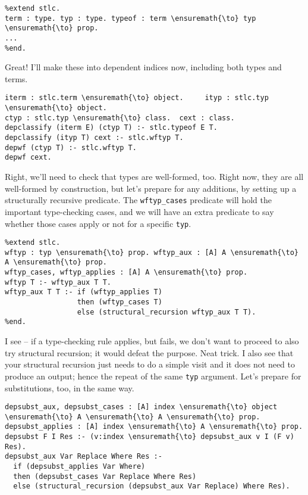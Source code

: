 \begin{verbatim}
%extend stlc.
term : type. typ : type. typeof : term \ensuremath{\to} typ \ensuremath{\to} prop.
...
%end.
\end{verbatim}



\heroSTUDENT{} Great! I'll make these into dependent indices now, including
both types and terms.

\begin{verbatim}
iterm : stlc.term \ensuremath{\to} object.     ityp : stlc.typ \ensuremath{\to} object.
ctyp : stlc.typ \ensuremath{\to} class.  cext : class.
depclassify (iterm E) (ctyp T) :- stlc.typeof E T.
depclassify (ityp T) cext :- stlc.wftyp T.
depwf (ctyp T) :- stlc.wftyp T.
depwf cext.
\end{verbatim}

\heroADVISOR{} Right, we'll need to check that types are well-formed, too.
Right now, they are all well-formed by construction, but let's prepare
for any additions, by setting up a structurally recursive predicate. The
\texttt{wftyp\_cases} predicate will hold the important type-checking
cases, and we will have an extra predicate to say whether those cases
apply or not for a specific \texttt{typ}.

\begin{verbatim}
%extend stlc.
wftyp : typ \ensuremath{\to} prop. wftyp_aux : [A] A \ensuremath{\to} A \ensuremath{\to} prop.
wftyp_cases, wftyp_applies : [A] A \ensuremath{\to} prop.
wftyp T :- wftyp_aux T T.
wftyp_aux T T :- if (wftyp_applies T)
                 then (wftyp_cases T)
                 else (structural_recursion wftyp_aux T T).
%end.
\end{verbatim}

\heroSTUDENT{} I see -- if a type-checking rule applies, but fails, we don't
want to proceed to also try structural recursion; it would defeat the
purpose. Neat trick. I also see that your structural recursion just
needs to do a simple visit and it does not need to produce an output;
hence the repeat of the same \texttt{typ} argument. Let's prepare for
substitutions, too, in the same way.

\begin{verbatim}
depsubst_aux, depsubst_cases : [A] index \ensuremath{\to} object \ensuremath{\to} A \ensuremath{\to} A \ensuremath{\to} prop.
depsubst_applies : [A] index \ensuremath{\to} A \ensuremath{\to} prop.
depsubst F I Res :- (v:index \ensuremath{\to} depsubst_aux v I (F v) Res).
depsubst_aux Var Replace Where Res :-
  if (depsubst_applies Var Where)
  then (depsubst_cases Var Replace Where Res)
  else (structural_recursion (depsubst_aux Var Replace) Where Res).
\end{verbatim}

